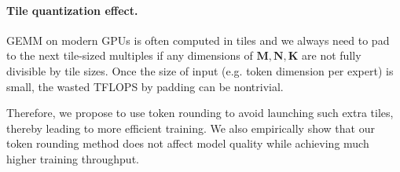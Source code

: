 \paragraph{Tile quantization effect.} GEMM on modern GPUs is often computed in tiles \citep{nvidia2022_h100} and we always need to pad to the next tile-sized multiples if any dimensions of $\mathbf{M},\mathbf{N},\mathbf{K}$ are not fully divisible by tile sizes. Once the size of input (e.g. token dimension per expert) is small, the wasted TFLOPS by padding can be nontrivial. 








Therefore, we propose to use token rounding to avoid launching such extra tiles, thereby leading to more efficient training. We also empirically show that our token rounding method does not affect model quality while achieving much higher training throughput.

